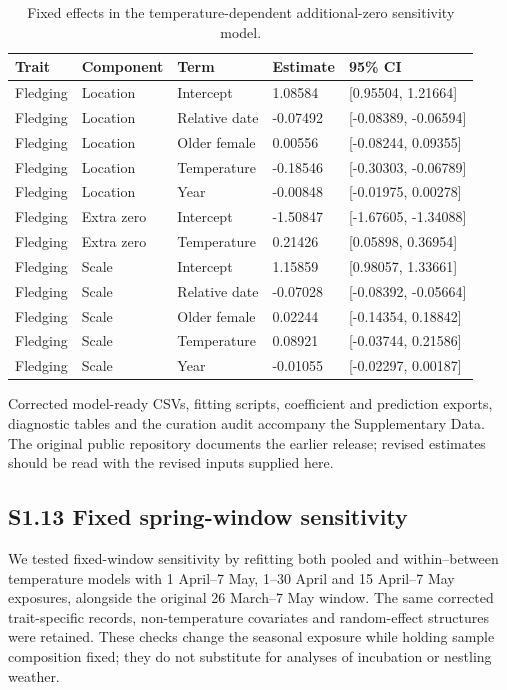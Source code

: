 \documentclass{article}
\begin{document}
\begin{table}[!ht]\centering\scriptsize\singlespacing
\caption{Fixed effects in the temperature-dependent additional-zero sensitivity model.}\label{tab:extra-zero-fixed}
\begin{tabular}{lllll}\toprule
Trait & Component & Term & Estimate & 95\% CI\\\midrule
Fledging & Location & Intercept & 1.08584 & [0.95504, 1.21664]\\
Fledging & Location & Relative date & -0.07492 & [-0.08389, -0.06594]\\
Fledging & Location & Older female & 0.00556 & [-0.08244, 0.09355]\\
Fledging & Location & Temperature & -0.18546 & [-0.30303, -0.06789]\\
Fledging & Location & Year & -0.00848 & [-0.01975, 0.00278]\\
Fledging & Extra zero & Intercept & -1.50847 & [-1.67605, -1.34088]\\
Fledging & Extra zero & Temperature & 0.21426 & [0.05898, 0.36954]\\
Fledging & Scale & Intercept & 1.15859 & [0.98057, 1.33661]\\
Fledging & Scale & Relative date & -0.07028 & [-0.08392, -0.05664]\\
Fledging & Scale & Older female & 0.02244 & [-0.14354, 0.18842]\\
Fledging & Scale & Temperature & 0.08921 & [-0.03744, 0.21586]\\
Fledging & Scale & Year & -0.01055 & [-0.02297, 0.00187]\\
\bottomrule\end{tabular}\end{table}
Corrected model-ready CSVs, fitting scripts, coefficient and prediction exports, diagnostic tables and the curation audit accompany the Supplementary Data. The original public repository documents the earlier release; revised estimates should be read with the revised inputs supplied here.

\subsection{S1.13 Fixed spring-window sensitivity}

We tested fixed-window sensitivity by refitting both pooled and within--between temperature models with 1 April--7 May, 1--30 April and 15 April--7 May exposures, alongside the original 26 March--7 May window. The same corrected trait-specific records, non-temperature covariates and random-effect structures were retained. These checks change the seasonal exposure while holding sample composition fixed; they do not substitute for analyses of incubation or nestling weather.
\end{document}
